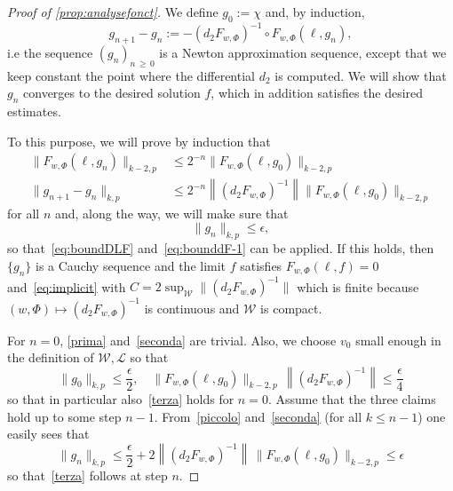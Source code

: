 \documentclass[10pt]{amsart}
\theoremstyle{definition}\newtheorem{defi}[theo]{Definition}\newtheorem{rema}[theo]{Remark}\newtheorem{exam}[theo]{Example}\newtheorem{exem}[theo]{Example}\newtheorem{nota}[theo]{Notation}
\newcommand{\clL}{\mathcal{L}}
\newcommand{\clW}{\mathcal{W}}
\newcommand{\norm}[1]{\lVert #1 \rVert}
\begin{document}
\begin{proof}[Proof of \cref{prop:analysefonct}]
We define $g_0 := \chi$ and, by induction,
\begin{equation}\label{eq:gngn-1}
g_{n+1} - g_{n} := -(d_2F_{w,\Phi})^{-1} \circ F_{w,\Phi}(
\ell, g_n),
\end{equation}
i.e the sequence $(g_{n})_{n\,\geq\,0}$ is a Newton approximation sequence, except that we keep constant the point where the differential $d_2$ is computed. We will show that $g_n$ converges to the desired solution $f$, which in addition satisfies the desired estimates.

To this purpose, we will prove by induction that
\begin{align}
\norm{F_{w,\Phi}(\ell, g_n)}_{{k-2, p}} &\leq 2^{-n}
\norm{F_{w,\Phi}(\ell, g_0)}_{{k-2, p}}\label{prima}\\
\norm{g_{n+1} - g_n}_{{k, p}} &\leq 2^{-n} \left\| (d_2F_{w,\Phi})^{-1} \right\| \norm{F_{w,\Phi}(\ell, g_0)}_{{k-2, p}}\label{seconda}
\end{align}
for all $n$ and, along the way, we will make sure that
\begin{equation}\label{terza}
\|g_n\|_{k,p}\le \epsilon,
\end{equation}
so that~\eqref{eq:boundDLF} and~\eqref{eq:bounddF-1} can be applied. If this holds, then $\{g_n\}$ is a Cauchy sequence and the limit $f$ satisfies $F_{w,\Phi}(\ell,f)=0$ and~\eqref{eq:implicit} with $C=2\sup_{\clW}\|(d_2 F_{w,\Phi})^{-1}\|$ which is finite because $(w,\Phi)\mapsto (d_2 F_{w,\Phi})^{-1}$ is continuous and $\clW$ is compact.

For $n=0$, \eqref{prima} and~\eqref{seconda} are trivial. Also, we choose $v_0$ small enough in the definition of $\clW,\clL$ so that
\begin{equation}\label{piccolo}
\|g_0\|_{k,p}\le \frac\epsilon2, \quad \|F_{w,\Phi}(\ell,g_0)\|_{k-2,p}\, \left\|(d_2 F_{w,\Phi})^{-1}\right\|\le \frac\epsilon4
\end{equation}
so that in particular also~\eqref{terza} holds for $n=0$. Assume that the three claims hold up to some step $n-1$. From~\eqref{piccolo} and~\eqref{seconda} (for all $k\le n-1$) one easily sees that
\begin{equation}
\|g_n\|_{k,p}\le \frac\epsilon2+2 \left\|(d_2 F_{w,\Phi})^{-1}\right\|\, \|F_{w,\Phi}(\ell,g_0)\|_{k-2,p}\le \epsilon
\end{equation}
so that~\eqref{terza} follows at step $n$.


\end{proof}
\end{document}
